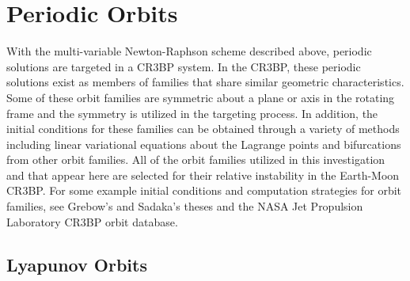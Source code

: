 \section{Periodic Orbits}\label{sec:PeriodicOrbits}
With the multi-variable Newton-Raphson scheme described above, periodic solutions are targeted in a
CR3BP system. In the CR3BP, these periodic solutions exist as members of families that share
similar geometric characteristics. Some of these orbit families are symmetric about a plane or axis
in the rotating frame and the symmetry is utilized in the targeting process. In addition, the
initial conditions for these families can be obtained through a variety of methods including linear
variational equations about the Lagrange points and bifurcations from other orbit families. All of
the orbit families utilized in this investigation and that appear here are selected for their
relative instability in the Earth-Moon CR3BP. For some example initial conditions and computation
strategies for orbit families, see Grebow's\cite{Grebow:2006} and Sadaka's\cite{Sadaka:2023} theses
and the NASA Jet Propulsion Laboratory CR3BP orbit database\cite{Park}.

\subsection{Lyapunov Orbits}
